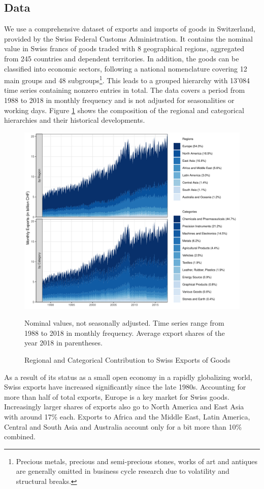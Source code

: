 \documentclass[a4paper,fleqn,11pt]{article}
\begin{document}
\subsection{Data}
We use a comprehensive dataset of exports and imports of goods in Switzerland, provided by the Swiss Federal Customs Administration. It contains the nominal value in Swiss francs of goods traded with 8 geographical regions, aggregated from 245 countries and dependent territories. In addition, the goods can be classified into economic sectors, following a national nomenclature covering 12 main groups and 48 subgroups\footnote{Precious metals, precious and semi-precious stones, works of art and antiques are generally omitted in business cycle research due to volatility and structural breaks.}. This leads to a grouped hierarchy with 13'084 time series containing nonzero entries in total. The data covers a period from 1988 to 2018 in monthly frequency and is not adjusted for seasonalities or working days. Figure \ref{fig:area} shows the composition of the regional and categorical hierarchies and their historical developments.
\begin{figure}[H]
	\includegraphics[width=\textwidth]{fig/fig_area}
	\caption{Regional and Categorical Contribution to Swiss Exports of Goods}\label{fig:area}
	\footnotesize{Nominal values, not seasonally adjusted. Time series range from 1988 to 2018 in monthly frequency. Average export shares of the year 2018 in parentheses.}
\end{figure}
As a result of its status as a small open economy in a rapidly globalizing world, Swiss exports have increased significantly since the late 1980s. Accounting for more than half of total exports, Europe is a key market for Swiss goods. Increasingly larger shares of exports also go to North America and East Asia with around 17\% each. Exports to Africa and the Middle East, Latin America, Central and South Asia and Australia account only for a bit more than 10\% combined.
\end{document}
